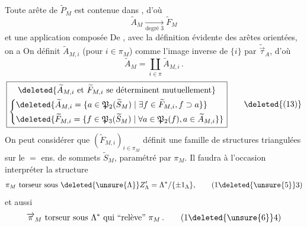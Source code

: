  Toute arête de $\widetilde P_M$ est contenue dans  , d'où
\[
 \widetilde A_M\xrightarrow[\text{degré }3]{}\widetilde F_M
\]
et une application composée
De , avec la définition évidente des arêtes orientées, on a
On définit $\widetilde A_{M,i}$  (pour $i\in\pi_M$) comme l'image inverse de $\{i\}$ par $\widetilde{\overrightarrow\tau}_A$, d'où
\[
 \widetilde A_M=\coprod_{i\in\pi}\widetilde A_{M,i}\,.\tag*{(12)}
\]
\[
\boxed{\begin{gathered}
 \deleted{\widetilde A_{M,i}\text{ et }\widetilde F_{M,i}\text{ se déterminent mutuellement}}\\
 \left\{\begin{aligned}
 &\deleted{\widetilde A_{M,i}=\{a\in\mathfrak P_2(\widetilde S_M)\mid\exists f\in\widetilde F_{M,i},f\supset a\}}\\
 &\deleted{\widetilde F_{M,i}=\{f\in\mathfrak P_3(\widetilde S_M)\mid\forall a\in\mathfrak P_2(f),a\in\widetilde A_{M,i}\}}
 \end{aligned}\right.
\end{gathered}}\tag*{\deleted{(13)}}
\]
 On peut considérer que $(\widetilde F_{M,i})_{i\in\pi_M}$ définit une famille de structures triangulées sur le $=$ ens. de sommets $\widetilde S_M$, paramétré par $\pi_M$.
Il faudra à l'occasion interpréter la structure
\[
 \pi_M\text{ torseur sous }\deleted{\unsure{\Lambda}} Z'_{\Lambda}=\Lambda^*/\{\pm1_\Lambda\},\tag*{(1\deleted{\unsure{5}}3)}
\]
et aussi
\[
 \overrightarrow\pi_M\text{ torseur sous }\Lambda^*\text{ qui ``relève'' }\pi_M\,.\tag*{(1\deleted{\unsure{6}}4)}
\]
